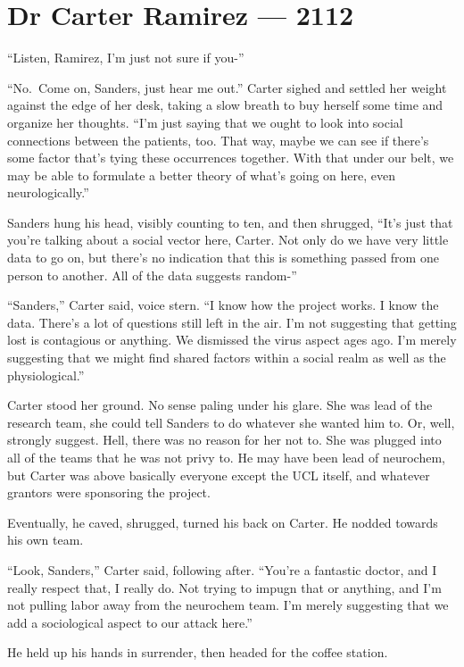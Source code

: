 \hypertarget{dr-carter-ramirez-2112}{%
\chapter*{Dr Carter Ramirez — 2112}\label{dr-carter-ramirez-2112}}

``Listen, Ramirez, I'm just not sure if you-''

``No.~Come on, Sanders, just hear me out.'' Carter sighed and settled her weight against the edge of her desk, taking a slow breath to buy herself some time and organize her thoughts. ``I'm just saying that we ought to look into social connections between the patients, too. That way, maybe we can see if there's some factor that's tying these occurrences together. With that under our belt, we may be able to formulate a better theory of what's going on here, even neurologically.''

Sanders hung his head, visibly counting to ten, and then shrugged, ``It's just that you're talking about a social vector here, Carter. Not only do we have very little data to go on, but there's no indication that this is something passed from one person to another. All of the data suggests random-''

``Sanders,'' Carter said, voice stern. ``I know how the project works. I know the data. There's a lot of questions still left in the air. I'm not suggesting that getting lost is contagious or anything. We dismissed the virus aspect ages ago. I'm merely suggesting that we might find shared factors within a social realm as well as the physiological.''

Carter stood her ground. No sense paling under his glare. She was lead of the research team, she could tell Sanders to do whatever she wanted him to. Or, well, strongly suggest. Hell, there was no reason for her not to. She was plugged into all of the teams that he was not privy to. He may have been lead of neurochem, but Carter was above basically everyone except the UCL itself, and whatever grantors were sponsoring the project.

Eventually, he caved, shrugged, turned his back on Carter. He nodded towards his own team.

``Look, Sanders,'' Carter said, following after. ``You're a fantastic doctor, and I really respect that, I really do. Not trying to impugn that or anything, and I'm not pulling labor away from the neurochem team. I'm merely suggesting that we add a sociological aspect to our attack here.''

He held up his hands in surrender, then headed for the coffee station.

